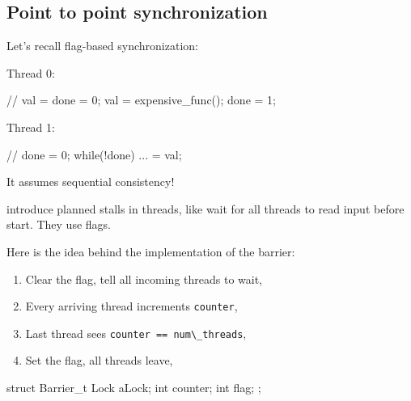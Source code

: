     \subsection{Point to point synchronization}
        \begin{tcolorbox}[violet]
        Let's recall flag-based synchronization:
        
        \vspace{0.8em}
        \begin{minipage}{0.48\textwidth}
            Thread 0:
                \begin{codeCenter}
                \begin{Ccode}
// val = done = 0;
val = expensive_func();
done = 1;
                \end{Ccode}
                \end{codeCenter}
            \end{minipage}
            \begin{minipage}{0.48\textwidth}
            Thread 1:
                \begin{codeCenter}
                \begin{Ccode}
// done = 0;
while(!done){ }
... = val;
                \end{Ccode}
                \end{codeCenter}
            \end{minipage}
        \end{tcolorbox}
        It assumes sequential consistency!
        \begin{tcolorbox}[vert]
            introduce planned stalls in threads, like wait for all threads to read input before start. They use flags.
        \end{tcolorbox}
        Here is the idea behind the implementation of the barrier:
        \begin{image}{
                \begin{enumerate}[left=10pt]
                    \item Clear the flag, tell all incoming threads to wait,
                    \item Every arriving thread increments \lstinline!counter!, 
                    \item Last thread sees \lstinline!counter == num\_threads!,
                    \item Set the flag, all threads leave,
                \end{enumerate}
            }
            \begin{codeCenter}
            \begin{Ccode}
struct Barrier_t {
    Lock aLock;
    int counter;
    int flag;
};
            \end{Ccode}
            \end{codeCenter}
        \end{image}
